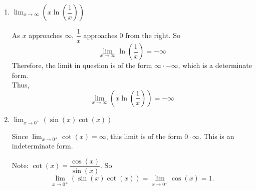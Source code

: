 \documentclass{ximera}
\begin{document}
\begin{problem}
\begin{enumerate}
\begin{explanation}
     We can see that $\displaystyle \lim_{x \to \infty}\left(\dfrac{\ln(x)}{x}\right)$ is of the form $\dfrac{\infty}{\infty}$,  so we can use L'Hopital's Rule.
     
      $$\stackrel{L.R.}{\implies} \displaystyle \lim_{x \to \infty}\left(\dfrac{1/x}{1}\right)=\displaystyle \lim_{x \to \infty}\left(\dfrac{1}{x}\right)=0$$
      
      Now we have: 
      $$\displaystyle \lim_{x \to \infty} \left(x\left(1-\dfrac{\ln(x)}{x}\right)\right)$$
      This limit has the form $\infty \cdot 1$.  This is a determinate form, and, therefore,

	 $\displaystyle \lim_{x \to \infty} (x-\ln(x)) =\infty$
   
    \end{explanation}

  \item  $\displaystyle \lim_{x \to \infty} \left( x \ln \left( \dfrac{1}{x} \right) \right) $
    \begin{explanation}
      As $x$ approaches $\infty$, $\dfrac{1}{x}$ approaches $0$ from the right.
      So  $$\displaystyle \lim_{x \to \infty} \ln \left( \dfrac{1}{x} \right) = - \infty $$
      Therefore, the limit in question is of the form $\infty \cdot - \infty$, which is a determinate form.\\
      Thus, 
      $$ \displaystyle \lim_{x \to \infty} \left( x \ln \left( \dfrac{1}{x} \right) \right) = - \infty $$
    \end{explanation}

  \item  $\displaystyle \lim_{x \to 0^+} (\sin(x) \cot(x) ) $
    \begin{explanation}
      Since $\displaystyle \lim_{x \to 0^+} \cot(x) = \infty$, this limit is of the form $0 \cdot \infty$.
      This is an indeterminate form.
      
     Note: $\cot(x) = \dfrac{\cos(x) }{\sin(x)}$.  So
      $$\displaystyle \lim_{x \to 0^+} (\sin(x) \cot(x) ) = \displaystyle \lim_{x \to 0^+} \cos(x) = 1 .$$
    \end{explanation}
  \end{enumerate}
\end{problem}
\end{document}
